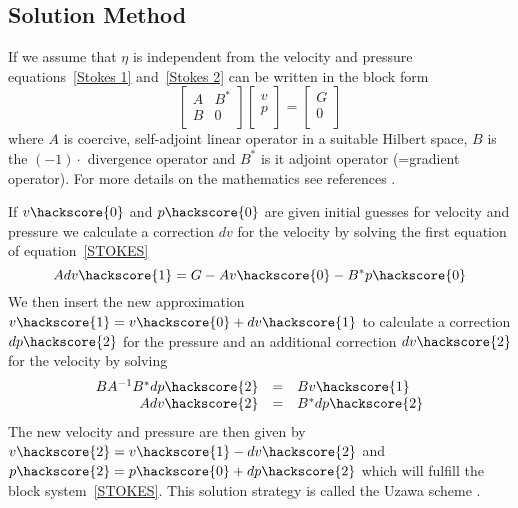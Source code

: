 \subsection{Solution Method \label{STOKES SOLVE}}
If we assume that $\eta$ is independent from the velocity and pressure equations~\ref{Stokes 1} and~\ref{Stokes 2} 
can be written in the block form
\begin{equation}
\left[ \begin{array}{cc}
A     & B^{*} \\
B & 0 \\
\end{array} \right]
\left[ \begin{array}{c}
v \\
p \\
\end{array} \right]
=\left[ \begin{array}{c}
G \\
0 \\
\end{array} \right]
\label{STOKES}
\end{equation}
where $A$ is coercive, self-adjoint linear operator in a suitable Hilbert space, $B$ is the $(-1) \cdot$ divergence operator and $B^{*}$ is it adjoint operator (=gradient operator).
For more details on the mathematics see references \cite{AAMIRBERKYAN2008,MBENZI2005}. 

If $v\hackscore{0}$ and $p\hackscore{0}$ are given initial guesses for
velocity and pressure we calculate a correction $dv$ for the velocity by solving the first
equation of equation~\ref{STOKES}
 \begin{equation}\label{STOKES ITER STEP 1}
 A dv\hackscore{1} = G - A v\hackscore{0} - B^{*} p\hackscore{0}
\end{equation}
We then insert the new approximation $v\hackscore{1}=v\hackscore{0}+dv\hackscore{1}$ to calculate a correction $dp\hackscore{2}$
for the pressure and an additional correction $dv\hackscore{2}$ for the velocity by solving
 \begin{equation}
 \begin{array}{rcl}
 B A^{-1} B^{*} dp\hackscore{2} & = & Bv\hackscore{1} \\
 A dv\hackscore{2} & = & B^{*} dp\hackscore{2} 
\end{array}
 \label{STOKES ITER STEP 2}
 \end{equation}
The new velocity and pressure are then given by $v\hackscore{2}=v\hackscore{1}-dv\hackscore{2}$ and
$p\hackscore{2}=p\hackscore{0}+dp\hackscore{2}$ which will fulfill the block system~\ref{STOKES}. 
This solution strategy is called the Uzawa scheme . 

